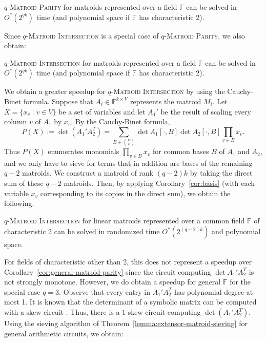 \documentclass{theoretics}
\newcommand{\F}{\ensuremath{\mathbb F}\xspace}
\begin{document}
\begin{theorem} \label{theorem:general-matroid-parity}
  \textsc{$q$-Matroid Parity} for matroids represented over a field $\F$ can be solved in $O^*(2^{qk})$ time (and polynomial space if $\F$ has characteristic 2).
\end{theorem}

Since \textsc{$q$-Matroid Intersection} is a special case of \textsc{$q$-Matroid Parity}, we also obtain:

\begin{corollary} \label{cor:general-matroid-parity}
   \textsc{$q$-Matroid Intersection} for matroids represented over a field $\F$ can be solved in $O^*(2^{qk})$ time (and polynomial space if $\F$ has characteristic 2).
\end{corollary}

We obtain a greater speedup for \textsc{$q$-Matroid Intersection} by using the Cauchy-Binet formula. 
Suppose that $A_i \in \F^{k \times V}$ represents the matroid $M_i$.
Let $X=\{x_v \mid v \in V\}$ be a set of variables and let $A_1'$ be
the result of scaling every column $v$ of $A_1$ by $x_v$.
By the Cauchy-Binet formula,
\[
  P(X) := \det (A_1' A_2^T) = \sum_{B \in \binom{V}{k}} \det
  A_1[\cdot,B] \det A_2[\cdot,B] \prod_{v \in B} x_v.
\]
Thus $P(X)$ enumerates monomials $\prod_{v \in B} x_v$ for
common bases $B$ of $A_1$ and $A_2$, and we only have to sieve for
terms that in addition are bases of the remaining $q-2$ matroids. 
We construct a matroid of rank $(q-2)k$ by taking the direct sum of these $q-2$ matroids. Then, by applying Corollary~\ref{cor:basis} (with each variable $x_v$ corresponding to its copies in the direct sum), we obtain the following.

\begin{theorem}
  \textsc{$q$-Matroid Intersection} for linear matroids represented
  over a common field $\F$ of characteristic 2 can be solved in
  randomized time $O^*(2^{(q-2)k})$ and polynomial space.
\end{theorem}

For fields of characteristic other than 2, this does not represent a speedup over Corollary~\ref{cor:general-matroid-parity}
since the circuit computing $\det A_1' A_2^T$ is not strongly monotone. 
However, we do obtain a speedup for general $\F$ for the special case $q=3$.
Observe that every entry in $A_1' A_2^T$ has polynomial degree at most 1.
It is known that the determinant of a symbolic matrix can be computed with a skew circuit \cite{MahajanV97}.
Thus, there is a 1-skew circuit computing $\det (A_1' A_2^T)$.
Using the sieving algorithm of Theorem~\ref{lemma:extensor-matroid-sieving} for general arithmetic circuits, we obtain:
\end{document}
